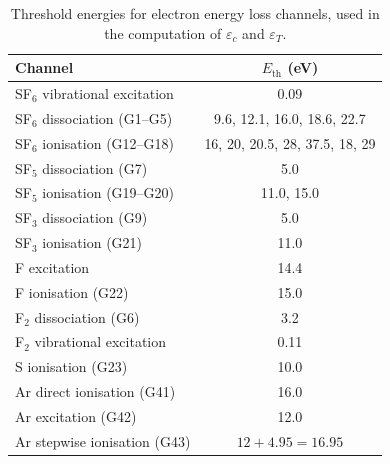 \documentclass[11pt,a4paper]{report}
\begin{document}
\begin{table}[H]
\centering
\caption{Threshold energies for electron energy loss channels, used in the computation of $\varepsilon_c$ and $\varepsilon_T$.}
\label{tab:app-thresholds}
\begin{tabular}{@{}lc@{}}
\toprule
\textbf{Channel} & $E_\mathrm{th}$ \textbf{(eV)} \\
\midrule
SF$_6$ vibrational excitation     & 0.09 \\
SF$_6$ dissociation (G1--G5)      & 9.6, 12.1, 16.0, 18.6, 22.7 \\
SF$_6$ ionisation (G12--G18)      & 16, 20, 20.5, 28, 37.5, 18, 29 \\
SF$_5$ dissociation (G7)          & 5.0 \\
SF$_5$ ionisation (G19--G20)      & 11.0, 15.0 \\
SF$_3$ dissociation (G9)          & 5.0 \\
SF$_3$ ionisation (G21)           & 11.0 \\
F excitation                      & 14.4 \\
F ionisation (G22)                & 15.0 \\
F$_2$ dissociation (G6)           & 3.2 \\
F$_2$ vibrational excitation      & 0.11 \\
S ionisation (G23)                & 10.0 \\
Ar direct ionisation (G41)        & 16.0 \\
Ar excitation (G42)               & 12.0 \\
Ar stepwise ionisation (G43)      & $12 + 4.95 = 16.95$ \\
\bottomrule
\end{tabular}
\end{table}
\end{document}

